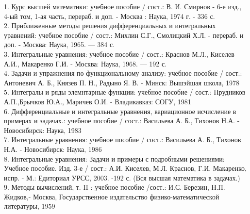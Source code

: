 \documentclass[12pt]{article}
\begin{document}
1.  Курс высшей математики: учебное пособие / сост.: В. И. Смирнов - 6-е изд., 4-ый том, 1-ая часть, перераб. и доп. - Москва : Наука, 1974 г. - 336 с.\\

2. Приближенные методы решения дифференциальных и интегральных уравнений: учебное пособие / сост.: Михлин С.Г., Смолицкий Х.Л. - перераб. и доп. - Москва: Наука, 1965. — 384 с. \\

3. Интегральные уравнения: учебное пособие / сост.: Краснов М.Л., Киселев А.И., Макаренко Г.И.  - Москва: Наука, 1968. — 192 с.\\

4. Задачи и упражнения по функциональному анализу: учебное пособие / сост.: Антоневич А. Б., Князев П. Н., Радыно Я. В. - Минск: Вышэйшая школа, 1978 \\

5. Интегралы и ряды элемнтарные функции: учебное пособие / сост.:  Прудников А.П.,Брычков Ю.А., Маричев О.И. - Владикавказ: СОГУ, 1981\\

6. Дифференциальные и интегральные уравнения, вариационное исчисление в примерах и задачах.: учебное пособие / сост.: Васильева А. Б., Тихонов Н.А. - Новосибирск: Наука, 1983 \\

7. Интегральные уравнения: учебное пособие / сост.: Васильева А. Б., Тихонов Н.А. - Новосибирск: Наука, 1986 \\

8. Интегральные уравнения: Задачи и примеры с подробными решениями: Учебное пособие. Изд. 3-е / сост.: А.И. Киселев, М.Л. Краснов, Г.И. Макаренко, испр. - М.: Едиториал УРСС, 2003. -192 с. (Вся высшая математика в задачах.)\\

9. Методы вычислений, т. II : учебное пособие /сост.: И.С. Березин, Н.П. Жидков,- Москва, Государственное издательство физико-математической литературы, 1959
\end{document}
